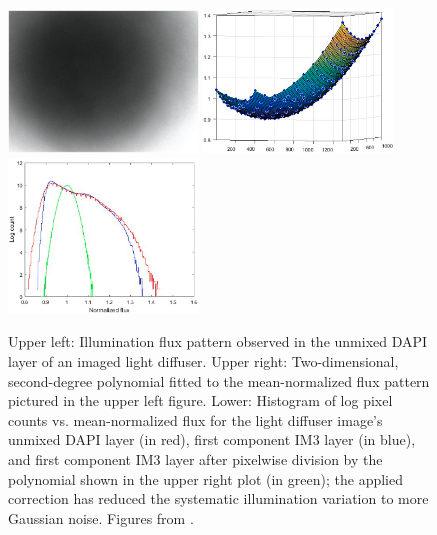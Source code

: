 \documentclass[letterpaper,11pt]{article}
\begin{document}
\begin{figure}[!ht]
\centering
\includegraphics[width=0.45\textwidth]{images/introduction/first_unmixed_DAPI_meanimage}
\includegraphics[width=0.45\textwidth]{images/introduction/first_DAPI_meanimage_polynomial_fit}
\includegraphics[width=0.45\textwidth]{images/introduction/first_DAPI_meanimage_corrected_flux}
\caption{\footnotesize Upper left: Illumination flux pattern observed in the unmixed DAPI layer of an imaged light diffuser. Upper right: Two-dimensional, second-degree polynomial fitted to the mean-normalized flux pattern pictured in the upper left figure. Lower: Histogram of log pixel counts vs. mean-normalized flux for the light diffuser image's unmixed DAPI layer (in red), first component IM3 layer (in blue), and first component IM3 layer after pixelwise division by the polynomial shown in the upper right plot (in green); the applied correction has reduced the systematic illumination variation to more Gaussian noise. Figures from \cite{Alex_flatfielding_1}.}
\label{fig:first_flatfielding}
\end{figure}
\end{document}

